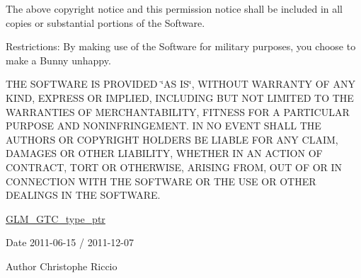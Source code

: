 The above copyright notice and this permission notice shall be included in all copies or substantial portions of the Software.

Restrictions\-: By making use of the Software for military purposes, you choose to make a Bunny unhappy.

T\-H\-E S\-O\-F\-T\-W\-A\-R\-E I\-S P\-R\-O\-V\-I\-D\-E\-D \char`\"{}\-A\-S I\-S\char`\"{}, W\-I\-T\-H\-O\-U\-T W\-A\-R\-R\-A\-N\-T\-Y O\-F A\-N\-Y K\-I\-N\-D, E\-X\-P\-R\-E\-S\-S O\-R I\-M\-P\-L\-I\-E\-D, I\-N\-C\-L\-U\-D\-I\-N\-G B\-U\-T N\-O\-T L\-I\-M\-I\-T\-E\-D T\-O T\-H\-E W\-A\-R\-R\-A\-N\-T\-I\-E\-S O\-F M\-E\-R\-C\-H\-A\-N\-T\-A\-B\-I\-L\-I\-T\-Y, F\-I\-T\-N\-E\-S\-S F\-O\-R A P\-A\-R\-T\-I\-C\-U\-L\-A\-R P\-U\-R\-P\-O\-S\-E A\-N\-D N\-O\-N\-I\-N\-F\-R\-I\-N\-G\-E\-M\-E\-N\-T. I\-N N\-O E\-V\-E\-N\-T S\-H\-A\-L\-L T\-H\-E A\-U\-T\-H\-O\-R\-S O\-R C\-O\-P\-Y\-R\-I\-G\-H\-T H\-O\-L\-D\-E\-R\-S B\-E L\-I\-A\-B\-L\-E F\-O\-R A\-N\-Y C\-L\-A\-I\-M, D\-A\-M\-A\-G\-E\-S O\-R O\-T\-H\-E\-R L\-I\-A\-B\-I\-L\-I\-T\-Y, W\-H\-E\-T\-H\-E\-R I\-N A\-N A\-C\-T\-I\-O\-N O\-F C\-O\-N\-T\-R\-A\-C\-T, T\-O\-R\-T O\-R O\-T\-H\-E\-R\-W\-I\-S\-E, A\-R\-I\-S\-I\-N\-G F\-R\-O\-M, O\-U\-T O\-F O\-R I\-N C\-O\-N\-N\-E\-C\-T\-I\-O\-N W\-I\-T\-H T\-H\-E S\-O\-F\-T\-W\-A\-R\-E O\-R T\-H\-E U\-S\-E O\-R O\-T\-H\-E\-R D\-E\-A\-L\-I\-N\-G\-S I\-N T\-H\-E S\-O\-F\-T\-W\-A\-R\-E.

\hyperlink{group__gtc__type__ptr}{G\-L\-M\-\_\-\-G\-T\-C\-\_\-type\-\_\-ptr}

\begin{DoxyDate}{Date}
2011-\/06-\/15 / 2011-\/12-\/07 
\end{DoxyDate}
\begin{DoxyAuthor}{Author}
Christophe Riccio 
\end{DoxyAuthor}
